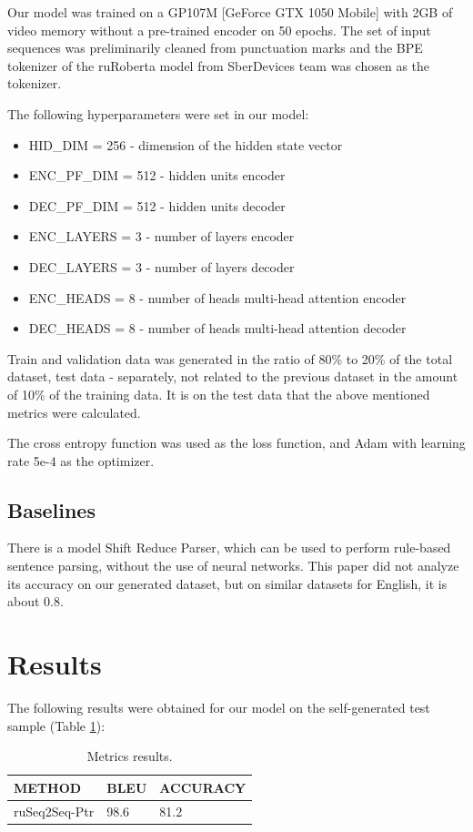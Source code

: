 \documentclass{article}
\begin{document}
Our model was trained on a GP107M [GeForce GTX 1050 Mobile] with 2GB of video memory without a pre-trained encoder on 50 epochs. The set of input sequences was preliminarily cleaned from punctuation marks and the BPE tokenizer of the ruRoberta model from SberDevices team was chosen as the tokenizer.

The following hyperparameters were set in our model:
\begin{itemize}
\item HID\_DIM = 256 - dimension of the hidden state vector
\item ENC\_PF\_DIM = 512 - hidden units encoder
\item DEC\_PF\_DIM = 512 - hidden units decoder
\item ENC\_LAYERS = 3 - number of layers encoder
\item DEC\_LAYERS = 3 - number of layers decoder
\item ENC\_HEADS = 8 - number of heads multi-head attention encoder
\item DEC\_HEADS = 8 - number of heads multi-head attention decoder
\end{itemize}

Train and validation data was generated in the ratio of 80\% to 20\% of the total dataset, test data - separately, not related to the previous dataset in the amount of 10\% of the training data. It is on the test data that the above mentioned metrics were calculated.

The cross entropy function was used as the loss function, and Adam with learning rate 5e-4 as the optimizer.

\subsection{Baselines}
There is a model Shift Reduce Parser, which can be used to perform rule-based sentence parsing, without the use of neural networks. This paper did not analyze its accuracy on our generated dataset, but on similar datasets for English, it is about 0.8.

\section{Results}

The following results were obtained for our model on the self-generated test sample (Table \ref{tab:results}):
\begin{table}[!tbh]
\begin{center}
\begin{tabular}{ | l | l | l | }
\hline
\textbf{METHOD} & \textbf{BLEU} & \textbf{ACCURACY} \\ \hline
ruSeq2Seq-Ptr & 98.6 & 81.2 \\
\hline
\end{tabular}
\caption{Metrics results.}
\label{tab:results}
\end{center}
\end{table}
\end{document}
